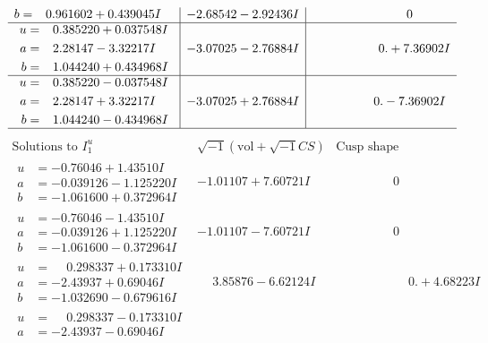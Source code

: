 \documentclass[1p]{elsarticle_modified}
\theoremstyle{definition}
\newcommand{\I}{\sqrt{-1}}
\begin{document}
$$\begin{array}{c|c|c}
\begin{aligned}
b &= \phantom{-}0.961602 + 0.439045 I\end{aligned}
 & -2.68542 - 2.92436 I & \phantom{-0.000000 } 0 \\ \hline\begin{aligned}
u &= \phantom{-}0.385220 + 0.037548 I \\
a &= \phantom{-}2.28147 - 3.32217 I \\
b &= \phantom{-}1.044240 + 0.434968 I\end{aligned}
 & -3.07025 - 2.76884 I & \phantom{-0.000000 -}0. + 7.36902 I \\ \hline\begin{aligned}
u &= \phantom{-}0.385220 - 0.037548 I \\
a &= \phantom{-}2.28147 + 3.32217 I \\
b &= \phantom{-}1.044240 - 0.434968 I\end{aligned}
 & -3.07025 + 2.76884 I & \phantom{-0.000000 } 0. - 7.36902 I\\
 \hline 
 \end{array}$$\newpage$$\begin{array}{c|c|c}  
\text{Solutions to }I^u_{1}& \I (\text{vol} + \sqrt{-1}CS) & \text{Cusp shape}\\
 \hline 
\begin{aligned}
u &= -0.76046 + 1.43510 I \\
a &= -0.039126 - 1.125220 I \\
b &= -1.061600 + 0.372964 I\end{aligned}
 & -1.01107 + 7.60721 I & \phantom{-0.000000 } 0 \\ \hline\begin{aligned}
u &= -0.76046 - 1.43510 I \\
a &= -0.039126 + 1.125220 I \\
b &= -1.061600 - 0.372964 I\end{aligned}
 & -1.01107 - 7.60721 I & \phantom{-0.000000 } 0 \\ \hline\begin{aligned}
u &= \phantom{-}0.298337 + 0.173310 I \\
a &= -2.43937 + 0.69046 I \\
b &= -1.032690 - 0.679616 I\end{aligned}
 & \phantom{-}3.85876 - 6.62124 I & \phantom{-0.000000 -}0. + 4.68223 I \\ \hline\begin{aligned}
u &= \phantom{-}0.298337 - 0.173310 I \\
a &= -2.43937 - 0.69046 I \\

\end{aligned}
\end{array}$$
\end{document}
